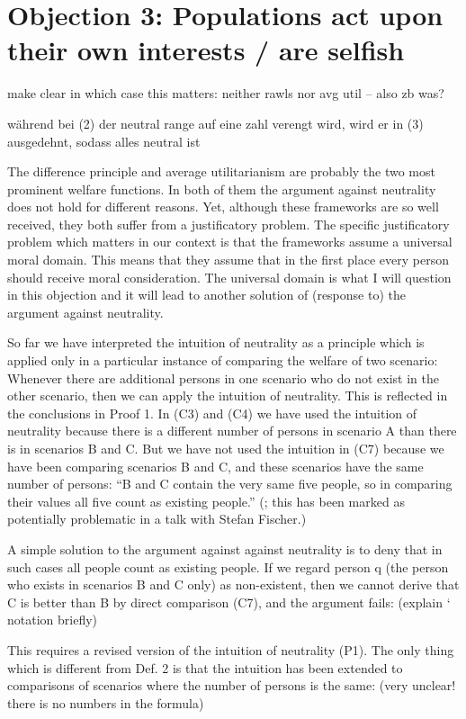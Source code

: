\section{Objection 3: Populations act upon their own interests / are selfish}
\label{sec:obj3}

make clear in which case this matters: neither rawls nor avg util – also zb was? 

während bei (2) der neutral range auf eine zahl verengt wird, wird er in (3) ausgedehnt, sodass alles neutral ist 

The difference principle and average utilitarianism are probably the two most prominent welfare functions. In both of them the argument against neutrality does not hold for different reasons. Yet, although these frameworks are so well received, they both suffer from a justificatory problem. The specific justificatory problem which matters in our context is that the frameworks assume a universal moral domain. This means that they assume that in the first place every person should receive moral consideration. The universal domain is what I will question in this objection and it will lead to another solution of (response to) the argument against neutrality.  

So far we have interpreted the intuition of neutrality as a principle which is applied only in a particular instance of comparing the welfare of two scenario: Whenever there are additional persons in one scenario who do not exist in the other scenario, then we can apply the intuition of neutrality. This is reflected in the conclusions in Proof 1. In (C3) and (C4) we have used the intuition of neutrality because there is a different number of persons in scenario A than there is in scenarios B and C. But we have not used the intuition in (C7) because we have been comparing scenarios B and C, and these scenarios have the same number of persons: “B and C contain the very same five people, so in comparing their values all five count as existing people.” (; this has been marked as potentially problematic in a talk with Stefan Fischer.) 

A simple solution to the argument against against neutrality is to deny that in such cases all people count as existing people. If we regard person q (the person who exists in scenarios B and C only) as non-existent, then we cannot derive that C is better than B by direct comparison (C7), and the argument fails: (explain ‘ notation briefly) 
\begin{comment}
\ \ (C7’)\ \ (A1) ${\wedge}$ (A2) ${\wedge}$ (A3) \ $\Rightarrow $ \ uB(P0) {\textgreater} uC(P0) 

\ \ (C8’)\ \ (C7’) ${\wedge}$ (P1) \ $\Rightarrow $ \ uB(P0 ${\cup}$ P+) {\textgreater} uC(P0 ${\cup}$ P+) 

\ \ (C9’)\ \ (C4) \ $\Leftrightarrow $ \ (C8) 
\end{comment}
This requires a revised version of the intuition of neutrality (P1). The only thing which is different from Def. 2 is that the intuition has been extended to comparisons of scenarios where the number of persons is the same: (very unclear! there is no numbers in the formula) 

